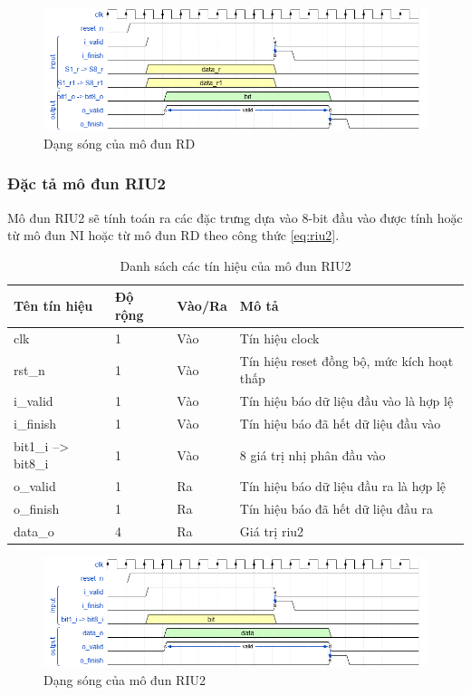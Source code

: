 \begin{figure}[!ht]
    \centering
    \includegraphics[width=\linewidth]{figures/rd.png}
    \caption{Dạng sóng của mô đun RD}
    \label{fig:rd}
\end{figure}
\newpage
\subsubsection{Đặc tả mô đun RIU2}
Mô đun RIU2 sẽ tính toán ra các đặc trưng dựa vào 8-bit đầu vào được tính hoặc từ mô đun NI hoặc từ mô đun RD theo công thức \ref{eq:riu2}.
\begin{table}[!ht]
    \centering
    \renewcommand{\arraystretch}{1.3} %
    \begin{tabular}{|p{3cm} p{2cm} p{2cm} p{8cm}|}
        \hline
        \rowcolor{gray!30}
        \textbf{Tên tín hiệu} & \textbf{Độ rộng} & \textbf{Vào/Ra} & \textbf{Mô tả} \\
        \hline
        clk & 1 & Vào & Tín hiệu clock \\
        \hline
        rst\_n & 1 & Vào & Tín hiệu reset đồng bộ, mức kích hoạt thấp \\
        \hline
        i\_valid & 1 & Vào & Tín hiệu báo dữ liệu đầu vào là hợp lệ \\
        \hline
        i\_finish & 1 & Vào & Tín hiệu báo đã hết dữ liệu đầu vào \\
        \hline
        bit1\_i --> bit8\_i & 1 & Vào & 8 giá trị nhị phân đầu vào\\
        \hline
        o\_valid & 1 & Ra & Tín hiệu báo dữ liệu đầu ra là hợp lệ\\
        \hline
        o\_finish & 1 & Ra & Tín hiệu báo đã hết dữ liệu đầu ra \\
        \hline
        data\_o & 4 & Ra & Giá trị riu2 \\
        \hline
    \end{tabular}
    \caption{Danh sách các tín hiệu của mô đun RIU2}
    \label{tab:signalListRIU2}
\end{table}
\begin{figure}[!ht]
    \centering
    \includegraphics[width=\linewidth]{figures/riu2.png}
    \caption{Dạng sóng của mô đun RIU2}
    \label{fig:riu2}
\end{figure}
